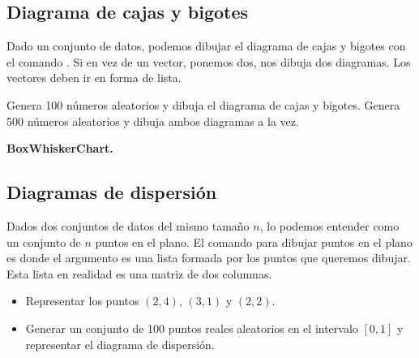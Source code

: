 \documentclass[a4paper,10pt, draft]{article}
\newcommand{\com}[1]{\textbf{\color{blue}{#1}}}
\newenvironment{ejer}{\begin{tcolorbox}[center title, title=Ejercicios,
fonttitle=\sffamily\bfseries,colback=blue!5,colframe=orange]}{\end{tcolorbox}}
\newenvironment{funciones}{\begin{tcolorbox}[center title, title=Nuevas funciones, fonttitle=\sffamily\bfseries, colback=green!5!white,colframe=red!75!black]}{\end{tcolorbox}\bigskip}
\begin{document}
\newpage

\subsection{Diagrama de  cajas y bigotes}

Dado un conjunto de datos, podemos dibujar el diagrama de cajas y bigotes con el comando \com{BoxWhiskerChart[v]}. Si en vez de un vector, ponemos dos, nos dibuja dos diagramas. Los vectores deben ir en forma de lista.


\begin{ejer}

Genera 100 números aleatorios y dibuja el diagrama de cajas y bigotes. Genera 500 números aleatorios y dibuja ambos diagramas a la vez.


\end{ejer}

\begin{funciones}

\textbf{BoxWhiskerChart.}

\end{funciones}



\newpage


\subsection{Diagramas de dispersión}

Dados dos conjuntos de datos del mismo tamaño $n$, lo podemos entender como un conjunto de $n$ puntos en el plano. El comando para dibujar puntos en el plano es \com{ListPlot[a]} donde el argumento es una lista formada por los puntos que queremos dibujar. Esta lista en realidad es una matriz de dos columnas.


\begin{ejer}

\begin{itemize}


\item Representar los puntos $(2,4)$, $(3,1)$ y $(2,2)$.

\item Generar un conjunto de 100 puntos reales aleatorios en el intervalo $[0,1]$ y representar el diagrama de dispersión.



\end{itemize}

\end{ejer}
\end{document}
